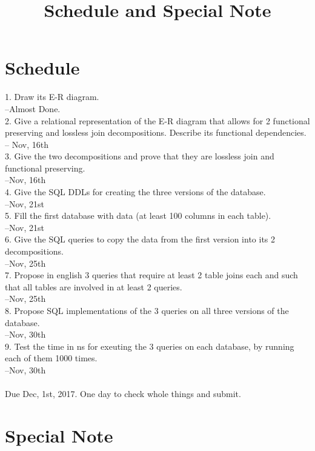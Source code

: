 \documentclass[12pt]{article}
\begin{document}
\title{Schedule and Special Note}
\maketitle

\section{Schedule}

1. Draw its E-R diagram.\\
	--Almost Done.\\
2. Give a relational representation of the E-R diagram that allows for 2 functional preserving and lossless join decompositions. Describe its functional dependencies.\\
	-- Nov, 16th\\
3. Give the two decompositions and prove that they are lossless join and functional preserving.\\
	--Nov, 16th\\
4. Give the SQL DDLs for creating the three versions of the database.\\
	--Nov, 21st\\
5. Fill the first database with data (at least 100 columns in each table).\\
	--Nov, 21st\\
6. Give the SQL queries to copy the data from the first version into its 2 decompositions.\\
	--Nov, 25th\\
7. Propose in english 3 queries that require at least 2 table joins each and such that all tables are involved in at least 2 queries.\\
	--Nov, 25th\\
8. Propose SQL implementations of the 3 queries on all three versions of the database.\\
	--Nov, 30th\\
9. Test the time in ns for exeuting the 3 queries on each database, by running each of them 1000 times.\\
	--Nov, 30th\\
\\
Due Dec, 1st, 2017. One day to check whole things and submit.

\section{Special Note}
\end{document}
